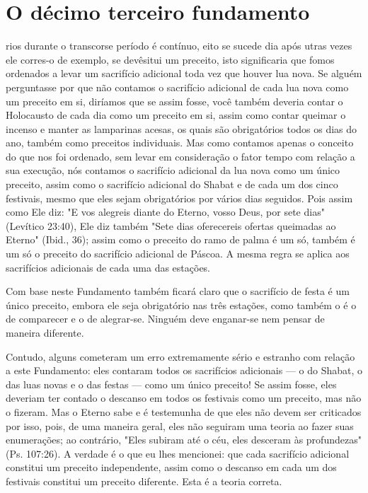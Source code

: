 \chapter*{O décimo terceiro fundamento}

rios durante o transcor­se período é contínuo, eito se sucede dia após
utras vezes ele corres-o de exemplo, se devês­itui um preceito, isto
sig­nificaria que fomos ordenados a levar um sacrifício adicional toda
vez que hou­ver lua nova. Se alguém perguntasse por que não contamos o
sacrifício adicional de cada lua nova como um preceito em si, diríamos
que se assim fosse, você tam­bém deveria contar o Holocausto de cada dia
como um preceito em si, assim como contar queimar o incenso e manter as
lamparinas acesas, os quais são obri­gatórios todos os dias do ano,
também como preceitos individuais. Mas como contamos apenas o conceito
do que nos foi ordenado, sem levar em considera­ção o fator tempo com
relação a sua execução, nós contamos o sacrifício adicio­nal da lua nova
como um único preceito, assim como o sacrifício adicional do Shabat e de
cada um dos cinco festivais, mesmo que eles sejam obrigatórios por
vários dias seguidos. Pois assim como Ele diz: "E vos alegreis diante do
Eterno, vosso Deus, por sete dias" (Levítico 23:40), Ele diz também
"Sete dias oferece­reis ofertas queimadas ao Eterno" (Ibid., 36); assim
como o preceito do ramo de palma é um só, também é um só o preceito do
sacrifício adicional de Páscoa. A mesma regra se aplica aos sacrifícios
adicionais de cada uma das estações.
 
 
 
 

Com base neste Fundamento também ficará claro que o sacrifício de festa
é um único preceito, embora ele seja obrigatório nas três estações,
co­mo também o é o de comparecer e o de alegrar-se. Ninguém deve
enganar-se nem pensar de maneira diferente.

Contudo, alguns cometeram um erro extremamente sério e estranho com
relação a este Fundamento: eles contaram todos os sacrifícios adicionais
--- o do Shabat, o das luas novas e o das festas --- como um único
preceito! Se assim fosse, eles deveriam ter contado o descanso em todos
os festivais co­mo um preceito, mas não o fizeram. Mas o Eterno sabe e é
testemunha de que eles não devem ser criticados por isso, pois, de uma
maneira geral, eles não seguiram uma teoria ao fazer suas enumerações;
ao contrário, "Eles subiram até o céu, eles desceram às profundezas"
(Ps. 107:26). A verdade é o que eu lhes mencionei: que cada sacrifício
adicional constitui um preceito indepen­dente, assim como o descanso em
cada um dos festivais constitui um preceito diferente. Esta é a teoria
correta.

